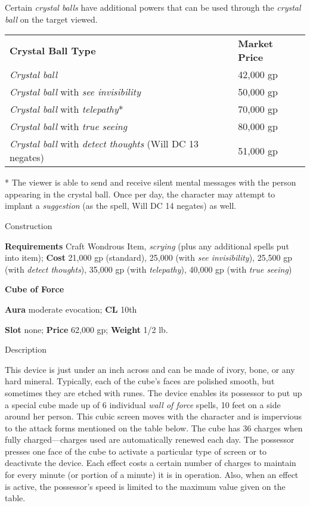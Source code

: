 Certain \textit{crystal balls }have additional powers that can be used through the \textit{crystal ball }on the target viewed.
\begin{tabularx}{\linewidth}{Xl}
\textbf{Crystal Ball Type} & \textbf{Market Price}\\
\textit{Crystal ball} & 42,000 gp\\
\textit{Crystal ball} with \textit{see invisibility} & 50,000 gp\\
\textit{Crystal ball} with \textit{telepathy}* & 70,000 gp\\
\textit{Crystal ball} with \textit{true seeing} & 80,000 gp\\
\textit{Crystal ball} with \textit{detect thoughts} (Will DC 13 negates) & 51,000 gp\\
\end{tabularx}
* The viewer is able to send and receive silent mental messages with the person appearing in the crystal ball. Once per day, the character may attempt to implant a \textit{suggestion} (as the spell, Will DC 14 negates) as well.

Construction
				
\textbf{Requirements} Craft Wondrous Item, \textit{scrying} (plus any additional spells put into item); \textbf{Cost }21,000 gp (standard), 25,000 (with \textit{see invisibility}), 25,500 gp (with \textit{detect thoughts}), 35,000 gp (with \textit{telepathy}), 40,000 gp (with \textit{true seeing})
				
\textbf{Cube of Force}
				
\textbf{Aura} moderate evocation;\textbf{ CL }10th
				
\textbf{Slot} none; \textbf{Price} 62,000 gp; \textbf{Weight }1/2 lb.
				
Description
				
This device is just under an inch across and can be made of ivory, bone, or any hard mineral. Typically, each of the cube's faces are polished smooth, but sometimes they are etched with runes. The device enables its possessor to put up a special cube made up of 6 individual \textit{wall of force }spells, 10 feet on a side around her person. This cubic screen moves with the character and is impervious to the attack forms mentioned on the table below. The cube has 36 charges when fully charged---charges used are automatically renewed each day. The possessor presses one face of the cube to activate a particular type of screen or to deactivate the device. Each effect costs a certain number of charges to maintain for every minute (or portion of a minute) it is in operation. Also, when an effect is active, the possessor's speed is limited to the maximum value given on the table.
				
